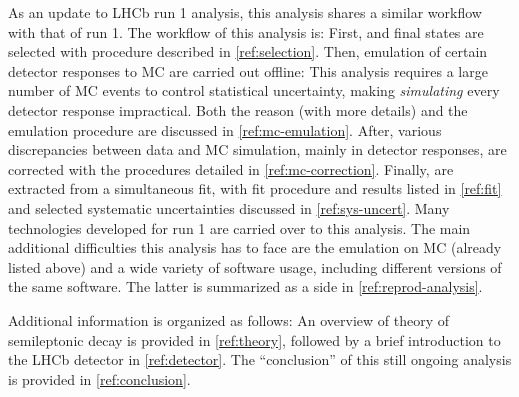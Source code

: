 
As an update to LHCb \RDX run 1 analysis, this analysis shares a similar
workflow with that of run 1.
The workflow of this analysis is:
First, \Dstarp\mun and \Dz\mun final states are selected with procedure
described in \cref{ref:selection}.
Then, emulation of certain detector responses to MC are carried out offline:
This analysis requires a large number of MC events to control statistical
uncertainty, making \emph{simulating} every detector response impractical.
Both the reason (with more details) and the emulation procedure are discussed in
\cref{ref:mc-emulation}.
After, various discrepancies between data and MC simulation,
mainly in detector responses, are corrected with the procedures detailed
in \cref{ref:mc-correction}.
Finally, \RDX are extracted from a simultaneous fit, with fit procedure and
results listed in \cref{ref:fit}
and selected systematic uncertainties discussed in
\cref{ref:sys-uncert}.
Many technologies developed for run 1 are carried over to this analysis.
The main additional difficulties this analysis has to face are the emulation
on MC (already listed above) and a wide variety of software usage, including
different versions of the same software.
The latter is summarized as a side in \cref{ref:reprod-analysis}.

Additional information is organized as follows:
An overview of theory of semileptonic \B decay is provided in
\cref{ref:theory},
followed by a brief introduction to the LHCb detector in \cref{ref:detector}.
The ``conclusion'' of this still ongoing analysis is provided in
\cref{ref:conclusion}.
